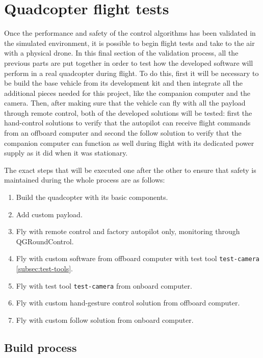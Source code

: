 \section{Quadcopter flight tests}

Once the performance and safety of the control algorithms has been validated in the simulated environment, it is possible to begin flight tests and take to the air with a physical drone.
In this final section of the validation process, all the previous parts are put together in order to test how the developed software will perform in a real quadcopter during flight.
To do this, first it will be necessary to be build the base vehicle from its development kit and then integrate all the additional pieces needed for this project, like the companion computer and the camera.
Then, after making sure that the vehicle can fly with all the payload through remote control, both of the developed solutions will be tested:
first the hand-control solutions to verify that the autopilot can receive flight commands from an offboard computer and second the follow solution to verify that the companion computer can function as well during flight with its dedicated power supply as it did when it was stationary.

The exact steps that will be executed one after the other to ensure that safety is maintained during the whole process are as follows:

\begin{enumerate}
    \item Build the quadcopter with its basic components.
    \item Add custom payload.
    \item Fly with remote control and factory autopilot only, monitoring through QGRoundControl.
    \item Fly with custom software from offboard computer with test tool \verb|test-camera| \ref{subsec:test-tools}.
    \item Fly with test tool \verb|test-camera| from onboard computer.
    \item Fly with custom hand-gesture control solution from offboard computer.
    \item Fly with custom follow solution from onboard computer.
\end{enumerate}

\subsection{Build process}
\label{sec:test-7-builddrone}

